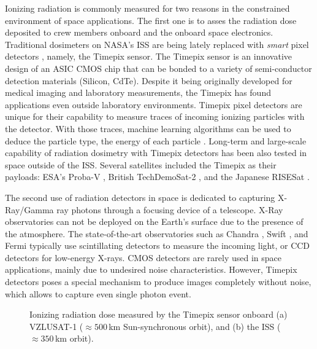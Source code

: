\documentclass[a4paper,11pt,titlepage,twoside]{book}
\begin{document}
Ionizing radiation is commonly measured for two reasons in the constrained environment of space applications.
The first one is to asses the radiation dose deposited to crew members onboard and the onboard space electronics.
Traditional dosimeters on NASA's \ac{ISS} are being lately replaced with \emph{smart} pixel detectors \cite{turecek2011small, stoffle2015timepix, pinsky2019timepix}, namely, the Timepix sensor.
The Timepix sensor \cite{llopart2007timepix, poikela2014timepix3} is an innovative design of an \ac{ASIC} \ac{CMOS} chip that can be bonded to a variety of semi-conductor detection materials (Silicon, CdTe).
Despite it being originally developed for medical imaging \cite{ballabriga2018asic} and laboratory measurements, the Timepix has found applications even outside laboratory environments.
Timepix pixel detectors are unique for their capability to measure traces of incoming ionizing particles with the detector.
With those traces, machine learning algorithms can be used to deduce the particle type, the energy of each particle \cite{granja2018resolving, baca2019timepix}.
Long-term and large-scale capability of radiation dosimetry with Timepix detectors has been also tested in space outside of the \ac{ISS}.
Several satellites included the Timepix as their payloads: ESA's Proba-V \cite{granja2014directional, granja2016satram}, British TechDemoSat-2 \cite{furnell2018first}, and the Japanese RISESat \cite{filgas2019risepix}.

The second use of radiation detectors in space is dedicated to capturing X-Ray/Gamma ray photons through a focusing device of a telescope.
X-Ray observatories can not be deployed on the Earth's surface due to the presence of the atmosphere.
The state-of-the-art observatories such as Chandra \cite{weisskopf2000chandra}, Swift \cite{gehrels2004swift}, and Fermi \cite{atwood2009large} typically use scintillating detectors to measure the incoming light, or \ac{CCD} detectors for low-energy X-rays.
\ac{CMOS} detectors are rarely used in space applications, mainly due to undesired noise characteristics.
However, Timepix detectors poses a special mechanism to produce images completely without noise, which allows to capture even single photon event.


\begin{figure}[!h]
  \centering
  \caption{Ionizing radiation dose measured by the Timepix sensor onboard (a) VZLUSAT-1 ($\approx 500$\,km Sun-synchronous orbit), and (b) the \acl{ISS} ($\approx 350$\,km orbit).}
  \label{fig:intro_radiation_maps}
\end{figure}
\end{document}
